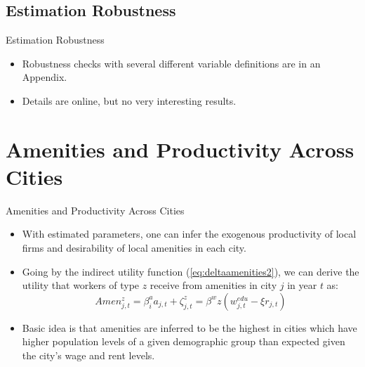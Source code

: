 \documentclass[aspectratio=169]{beamer}
\begin{document}

\subsection{Estimation Robustness}


\begin{frame}{Estimation Robustness}

\begin{itemize}
    \item<1-> Robustness checks with several different variable definitions are in an Appendix.
    \item<2-> Details are online, but no very interesting results.
\end{itemize}
    
\end{frame}


\section{Amenities and Productivity Across Cities}


\begin{frame}{Amenities and Productivity Across Cities}

\begin{itemize}
    \item<1->  With estimated parameters, one can infer the exogenous productivity of local firms and desirability of local amenities in each city.
    \item<2-> Going by the indirect utility function (\ref{eq:deltaamenities2}), we can derive the utility that workers of type $ z $ receive from amenities in city $ j $ in year $ t $ as:
    \begin{equation*}
        Amen_{j,t}^{z} = \beta_{i}^{a} a_{j,t} + \zeta_{j,t}^{z} = \beta^{w} z\left( w_{j,t}^{edu} - \xi r_{j,t} \right)
    \end{equation*}
    \item<3->  Basic idea is that amenities are inferred to be the highest in cities which have higher population levels of a given demographic group than expected given the city’s wage and rent levels.
\end{itemize}
    
\end{frame}
\end{document}

